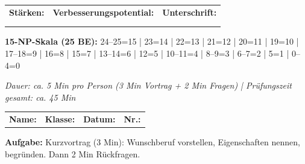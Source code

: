 \documentclass[11pt, a4paper]{article}
\begin{document}
\vspace{0.3cm}

\begin{tabular}{@{}p{5cm}p{6cm}p{5.5cm}@{}}
\textbf{Stärken:} & \textbf{Verbesserungspotential:} & \textbf{Unterschrift:} \\
\dotfill & \dotfill & \dotfill \\
\dotfill & \dotfill & \\
\end{tabular}

\vspace{0.2cm}

\scriptsize\textbf{15-NP-Skala (25 BE):} 24--25=15 | 23=14 | 22=13 | 21=12 | 20=11 | 19=10 | 17--18=9 | 16=8 | 15=7 | 13--14=6 | 12=5 | 10--11=4 | 8--9=3 | 6--7=2 | 5=1 | 0--4=0

\newpage


\begin{center}
\end{center}

\vspace{0.2cm}

\begin{center}
\small\textit{Dauer: ca. 5 Min pro Person (3 Min Vortrag + 2 Min Fragen) | Prüfungszeit gesamt: ca. 45 Min}
\end{center}

\vspace{0.2cm}

\begin{tabular}{@{}p{5cm}p{4cm}p{4cm}p{3cm}@{}}
\textbf{Name:} \dotfill & \textbf{Klasse:} \dotfill & \textbf{Datum:} \dotfill & \textbf{Nr.:} \dotfill \\
\end{tabular}

\vspace{0.3cm}

\textbf{Aufgabe:} Kurzvortrag (3 Min): Wunschberuf vorstellen, Eigenschaften nennen, begründen. Dann 2 Min Rückfragen.
\end{document}
